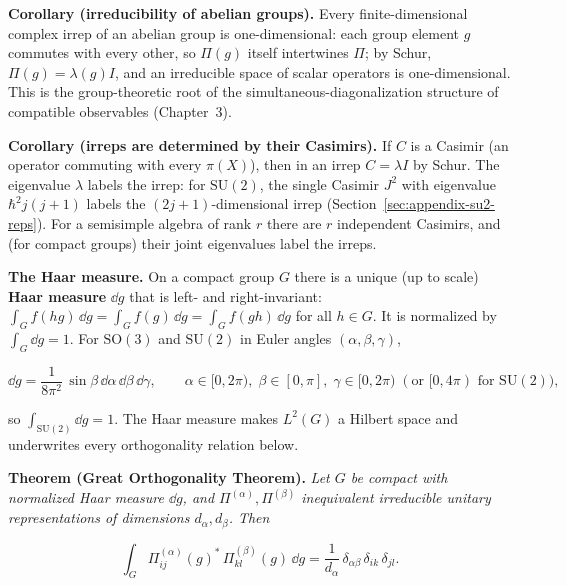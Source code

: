 \medskip\noindent\textbf{Corollary (irreducibility of abelian groups).} Every finite-dimensional complex irrep of an abelian group is one-dimensional: each group element $g$ commutes with every other, so $\Pi(g)$ itself intertwines $\Pi$; by Schur, $\Pi(g)=\lambda(g)I$, and an irreducible space of scalar operators is one-dimensional. This is the group-theoretic root of the simultaneous-diagonalization structure of compatible observables (Chapter~3).

\medskip\noindent\textbf{Corollary (irreps are determined by their Casimirs).} If $C$ is a Casimir (an operator commuting with every $\pi(X)$), then in an irrep $C=\lambda I$ by Schur. The eigenvalue $\lambda$ labels the irrep: for $\mathrm{SU}(2)$, the single Casimir $J^{2}$ with eigenvalue $\hbar^{2}j(j+1)$ labels the $(2j+1)$-dimensional irrep (Section~\ref{sec:appendix-su2-reps}). For a semisimple algebra of rank $r$ there are $r$ independent Casimirs, and (for compact groups) their joint eigenvalues label the irreps.

\medskip\noindent\textbf{The Haar measure.} On a compact group $G$ there is a unique (up to scale) \textbf{Haar measure} $\dd g$ that is left- and right-invariant: $\int_{G}f(hg)\,\dd g=\int_{G}f(g)\,\dd g=\int_{G}f(gh)\,\dd g$ for all $h\in G$. It is normalized by $\int_{G}\dd g=1$. For $\mathrm{SO}(3)$ and $\mathrm{SU}(2)$ in Euler angles $(\alpha,\beta,\gamma)$,
\begin{linenomath}
\begin{equation}
\dd g=\frac{1}{8\pi^{2}}\,\sin\beta\,\dd\alpha\,\dd\beta\,\dd\gamma,\qquad
\alpha\in[0,2\pi),\;\beta\in[0,\pi],\;\gamma\in[0,2\pi)\;(\text{or }[0,4\pi)\text{ for }\mathrm{SU}(2)),
\label{eq:haar-su2}
\end{equation}
\end{linenomath}
so $\int_{\mathrm{SU}(2)}\dd g=1$. The Haar measure makes $L^{2}(G)$ a Hilbert space and underwrites every orthogonality relation below.

\medskip\noindent\textbf{Theorem (Great Orthogonality Theorem).} \emph{Let $G$ be compact with normalized Haar measure $\dd g$, and $\Pi^{(\alpha)},\Pi^{(\beta)}$ inequivalent irreducible unitary representations of dimensions $d_{\alpha},d_{\beta}$. Then}
\begin{linenomath}
\begin{equation}
\int_{G}\Pi^{(\alpha)}_{ij}(g)^{*}\,\Pi^{(\beta)}_{kl}(g)\,\dd g
=\frac{1}{d_{\alpha}}\,\delta_{\alpha\beta}\,\delta_{ik}\,\delta_{jl}.
\label{eq:great-orthogonality}
\end{equation}
\end{linenomath}

